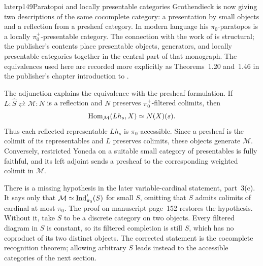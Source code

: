 \begin{itemize}[leftmargin=2.5em]

\begin{dcomment}{later}{p149}{Paratopoi and locally presentable categories}
Grothendieck is now giving two descriptions of the same cocomplete category: a presentation by small objects and a reflection from a presheaf category. In modern language his $\pi_0$-paratopos is a locally $\pi_0^+$-presentable category. The connection with the work of \citet{GabrielUlmer1971} is structural; the publisher's contents place presentable objects, generators, and locally presentable categories together in the central part of that monograph. The equivalences used here are recorded more explicitly as Theorems~1.20 and~1.46 in the publisher's chapter introduction to \citet{AdamekRosicky1994}.

The adjunction explains the equivalence with the presheaf formulation. If
$L:\widehat S\rightleftarrows\mathcal M:N$ is a reflection and $N$ preserves $\pi_0^+$-filtered colimits, then
\[
 \operatorname{Hom}_{\mathcal M}(Lh_s,X)\simeq N(X)(s).
\]
Thus each reflected representable $Lh_s$ is $\pi_0$-accessible. Since a presheaf is the colimit of its representables and $L$ preserves colimits, these objects generate $\mathcal M$. Conversely, restricted Yoneda on a suitable small category of presentables is fully faithful, and its left adjoint sends a presheaf to the corresponding weighted colimit in $\mathcal M$.

There is a missing hypothesis in the later variable-cardinal statement, part~3(c). It says only that $\mathcal M\simeq\operatorname{Ind}'_{\pi_0}(S)$ for small $S$, omitting that $S$ admits colimits of cardinal at most $\pi_0$. The proof on manuscript page~152 restores the hypothesis. Without it, take $S$ to be a discrete category on two objects. Every filtered diagram in $S$ is constant, so its filtered completion is still $S$, which has no coproduct of its two distinct objects. The corrected statement is the cocomplete recognition theorem; allowing arbitrary $S$ leads instead to the accessible categories of the next section.
\end{dcomment}



\end{itemize}
